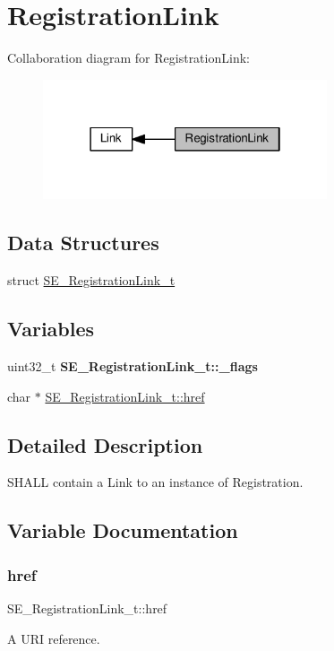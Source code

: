 \hypertarget{group__RegistrationLink}{}\section{Registration\+Link}
\label{group__RegistrationLink}
Collaboration diagram for Registration\+Link\+:\nopagebreak
\begin{figure}[H]
\begin{center}
\leavevmode
\includegraphics[width=238pt]{group__RegistrationLink}
\end{center}
\end{figure}
\subsection*{Data Structures}
\begin{DoxyCompactItemize}
\item 
struct \hyperlink{structSE__RegistrationLink__t}{S\+E\+\_\+\+Registration\+Link\+\_\+t}
\end{DoxyCompactItemize}
\subsection*{Variables}
\begin{DoxyCompactItemize}
\item 
\mbox{\label{group__RegistrationLink_ga7b8a941c5f81232370ed68a588515204}} 
uint32\+\_\+t {\bfseries S\+E\+\_\+\+Registration\+Link\+\_\+t\+::\+\_\+flags}
\item 
char $\ast$ \hyperlink{group__RegistrationLink_gafe60311d958b8e03a852890540553df2}{S\+E\+\_\+\+Registration\+Link\+\_\+t\+::href}
\end{DoxyCompactItemize}


\subsection{Detailed Description}
S\+H\+A\+LL contain a Link to an instance of Registration. 

\subsection{Variable Documentation}
\mbox{\label{group__RegistrationLink_gafe60311d958b8e03a852890540553df2}} 
\subsubsection{\texorpdfstring{href}{href}}
{\footnotesize\ttfamily S\+E\+\_\+\+Registration\+Link\+\_\+t\+::href}

A U\+RI reference. 